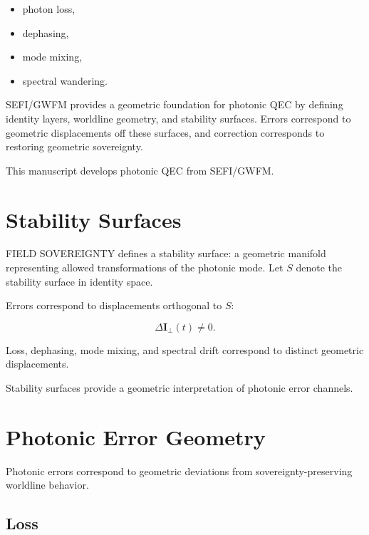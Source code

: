 \documentclass[12pt,twoside]{article}
\begin{document}
\begin{itemize}
    \item photon loss,
    \item dephasing,
    \item mode mixing,
    \item spectral wandering.
\end{itemize}

SEFI/GWFM provides a geometric foundation for photonic QEC by defining identity layers,
worldline geometry, and stability surfaces. Errors correspond to geometric displacements
off these surfaces, and correction corresponds to restoring geometric sovereignty.

This manuscript develops photonic QEC from SEFI/GWFM.

\section{Stability Surfaces}

FIELD SOVEREIGNTY defines a stability surface: a geometric manifold representing allowed
transformations of the photonic mode. Let $S$ denote the stability surface in identity space.

Errors correspond to displacements orthogonal to $S$:



\[
\Delta \mathbf{I}_{\perp}(t) \neq 0.
\]



Loss, dephasing, mode mixing, and spectral drift correspond to distinct geometric
displacements.

Stability surfaces provide a geometric interpretation of photonic error channels.

\section{Photonic Error Geometry}

Photonic errors correspond to geometric deviations from sovereignty-preserving worldline
behavior.

\subsection{Loss}
\end{document}
